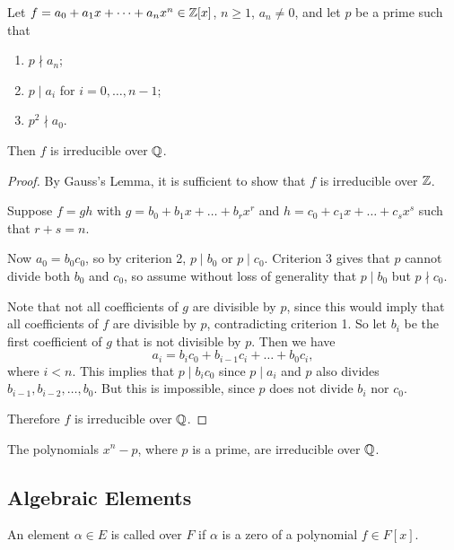 \begin{theorem}
	Let $f = a_0 + a_1 x + \dots + a_n x^n \in \mathbb{Z}[x]$, $n \geq 1$, $a_n \neq 0$, and let $p$ be a prime such that
	\begin{enumerate}
		\item $p \nmid a_n$;
		\item $p \mid a_i$ for $i = 0, \dots, n - 1$;
		\item $p^2 \nmid a_0$.
	\end{enumerate}
	Then $f$ is irreducible over $\mathbb{Q}$.
	\begin{proof}
		By Gauss's Lemma, it is sufficient to show that $f$ is irreducible over $\mathbb{Z}$.
		
		Suppose $f = gh$ with $g = b_0 + b_1 x + \dots + b_r x^r$ and $h = c_0 + c_1 x + \dots + c_s x^s$ such that $r + s = n$.
		
		Now $a_0 = b_0 c_0$, so by criterion 2, $p \mid b_0$ or $p \mid c_0$. Criterion 3 gives that $p$ cannot divide both $b_0$ and $c_0$, so assume without loss of generality that $p \mid b_0$ but $p \nmid c_0$.
		
		Note that not all coefficients of $g$ are divisible by $p$, since this would imply that all coefficients of $f$ are divisible by $p$, contradicting criterion 1. So let $b_i$ be the first coefficient of $g$ that is not divisible by $p$. Then we have
		\[
			a_i = b_i c_0 + b_{i - 1} c_i + \dots + b_0 c_i,
		\]
		where $i < n$. This implies that $p \mid b_i c_0$ since $p \mid a_i$ and $p$ also divides $b_{i - 1}, b_{i - 2}, \dots, b_0$. But this is impossible, since $p$ does not divide $b_i$ nor $c_0$.
		
		Therefore $f$ is irreducible over $\mathbb{Q}$.
	\end{proof}
\end{theorem}

\begin{corollary}
	The polynomials $x^n - p$, where $p$ is a prime, are irreducible over $\mathbb{Q}$.
\end{corollary}

\subsection{Algebraic Elements}
\begin{definition}
	An element $\alpha \in E$ is called  over $F$ if $\alpha$ is a zero of a polynomial $f \in F[x]$.
\end{definition}

